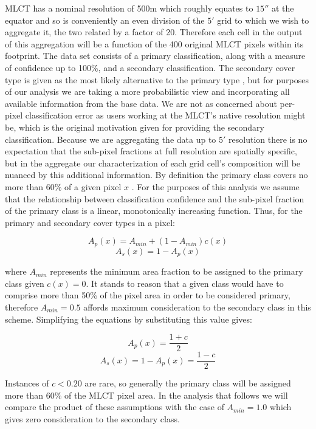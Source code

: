 MLCT has a nominal resolution of 500m which roughly equates to $15''$
at the equator and so is conveniently an even division of the $5'$
grid to which we wish to aggregate it, the two related by a factor of
20.  Therefore each cell in the output of this aggregation will be a
function of the 400 original MLCT pixels within its footprint.  The
data set consists of a primary classification, along with a measure of
confidence up to 100\%, and a secondary classification.  The secondary
cover type is given as the most likely alternative to the primary type
\citep{Friedl2010}, but for purposes of our analysis we are taking a
more probabilistic view and incorporating all available information
from the base data.  We are not as concerned about per-pixel
classification error as users working at the MLCT's native resolution
might be, which is the original motivation given for providing the
secondary classification.  Because we are aggregating the data up to
$5'$ resolution there is no expectation that the sub-pixel
fractions at full resolution are spatially specific, but in the
aggregate our characterization of each grid cell's composition will be
nuanced by this additional information.  By definition the primary
class covers no more than 60\% of a given pixel $x$
\citep{Friedl2002}.  For the purposes of this analysis we assume that
the relationship between classification confidence and the sub-pixel
fraction of the primary class is a linear, monotonically increasing
function. Thus, for the primary and secondary cover types in a pixel:

$$
A_p(x) = A_{min} + (1 - A_{min}) c(x)
$$
$$
A_s(x) = 1 - A_p(x)
$$

\noindent where $A_{min}$ represents the minimum area fraction to be
assigned to the primary class given $c(x)=0$.  It stands to reason
that a given class would have to comprise more than 50\% of the pixel
area in order to be considered primary, therefore $A_{min}=0.5$
affords maximum consideration to the secondary class in this
scheme. Simplifying the equations by substituting this value gives:

$$
A_p(x) = \dfrac{1 + c}{2}
$$
$$
A_s(x) = 1 - A_p(x) = \dfrac{1-c}{2}
$$

Instances of $c < 0.20$ are rare, so generally the primary class will
be assigned more than 60\% of the MLCT pixel area.   In the
analysis that follows we will compare the product of these assumptions
with the case of $A_{min}=1.0$ which gives zero consideration to the
secondary class.




